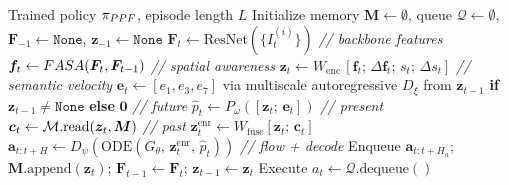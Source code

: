 \begin{algorithm}[t]
\caption{\method{} Inference}
\label{alg:inference}
\begin{algorithmic}[1]
\REQUIRE Trained policy $\pi_{PPF{}}$, episode length $L$
\STATE Initialize memory $\bm{M} \leftarrow \emptyset$, queue $\mathcal{Q} \leftarrow \emptyset$, $\bm{F}_{-1} \leftarrow \texttt{None}$, $\bm{z}_{-1} \leftarrow \texttt{None}$
        \STATE $\bm{F}_t \leftarrow \text{ResNet}(\{I_t^{(i)}\})$ \hfill \textit{// backbone features}
        \STATE $\bm{f}_t \leftarrow FASA{}(\bm{F}_t, \bm{F}_{t-1})$ \hfill \textit{// spatial awareness}
        \STATE $\bm{z}_t \leftarrow W_{\text{enc}}\,[\bm{f}_t;\, \Delta\bm{f}_t;\, s_t;\, \Delta s_t]$ \hfill \textit{// semantic velocity}
        \STATE $\bm{e}_t \leftarrow [e_1, e_3, e_7]$ via multiscale autoregressive $D_\xi$ from $\bm{z}_{t-1}$ \textbf{if} $\bm{z}_{t-1} \neq \texttt{None}$ \textbf{else} $\bm{0}$ \hfill \textit{// future}
        \STATE $\hat{p}_t \leftarrow P_\omega([\bm{z}_t;\, \bm{e}_t])$ \hfill \textit{// present}
        \STATE $\bm{c}_t \leftarrow \mathcal{M}.\text{read}(\bm{z}_t, \bm{M})$ \hfill \textit{// past}
        \STATE $\bm{z}_t^{\text{enr}} \leftarrow W_{\text{fuse}}[\bm{z}_t;\, \bm{c}_t]$
        \STATE $\bm{a}_{t:t+H} \leftarrow D_\psi\!\left(\text{ODE}(G_\theta,\, \bm{z}_t^{\text{enr}},\, \hat{p}_t)\right)$ \hfill \textit{// flow + decode}
        \STATE Enqueue $\bm{a}_{t:t+H_a}$; \; $\bm{M}.\text{append}(\bm{z}_t)$; \; $\bm{F}_{t-1} \leftarrow \bm{F}_t$; \; $\bm{z}_{t-1} \leftarrow \bm{z}_t$
    \ENDIF
    \STATE Execute $a_t \leftarrow \mathcal{Q}.\text{dequeue}()$
\ENDFOR
\end{algorithmic}
\end{algorithm}
